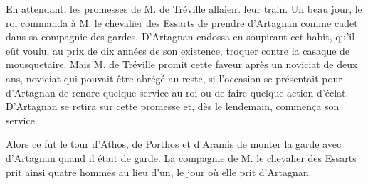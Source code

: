 En attendant, les promesses de M. de Tréville allaient leur train. Un beau jour, le roi commanda à M. le chevalier des Essarts de prendre d'Artagnan comme cadet dans sa compagnie des gardes. D'Artagnan endossa en soupirant cet habit, qu'il eût voulu, au prix de dix années de son existence, troquer contre la casaque de mousquetaire. Mais M. de Tréville promit cette faveur après un noviciat de deux ans, noviciat qui pouvait être abrégé au reste, si l'occasion se présentait pour d'Artagnan de rendre quelque service au roi ou de faire quelque action d'éclat. D'Artagnan se retira sur cette promesse et, dès le lendemain, commença son service. 

Alors ce fut le tour d'Athos, de Porthos et d'Aramis de monter la garde avec d'Artagnan quand il était de garde. La compagnie de M. le chevalier des Essarts prit ainsi quatre hommes au lieu d'un, le jour où elle prit d'Artagnan.